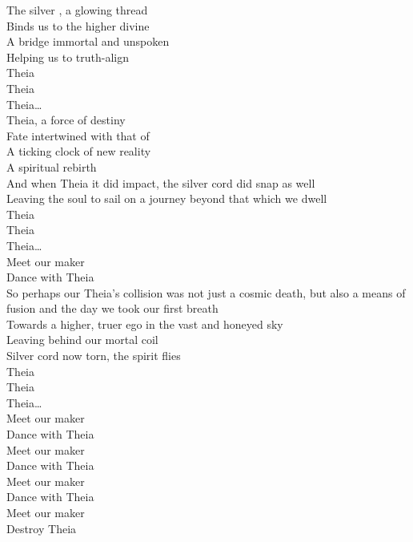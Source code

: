 



The silver , a glowing thread\\
Binds us to the higher divine\\
A bridge immortal and unspoken\\
Helping us to truth-align\\

Theia\\
Theia\\
Theia…\\

Theia, a force of destiny\\
Fate intertwined with that of \\
A ticking clock of new reality\\
A spiritual rebirth\\
And when Theia it did impact, the silver cord did snap as well\\
Leaving the soul to sail on a journey beyond that which we dwell\\

Theia\\
Theia\\
Theia…\\

Meet our maker\\
Dance with Theia\\

So perhaps our Theia's collision was not just a cosmic death, but also a means of fusion and the day we took our first breath\\
Towards a higher, truer ego in the vast and honeyed sky\\
Leaving behind our mortal coil\\
Silver cord now torn, the spirit flies\\

Theia\\
Theia\\
Theia…\\

Meet our maker\\
Dance with Theia\\
Meet our maker\\
Dance with Theia\\
Meet our maker\\
Dance with Theia\\
Meet our maker\\
Destroy Theia\\

